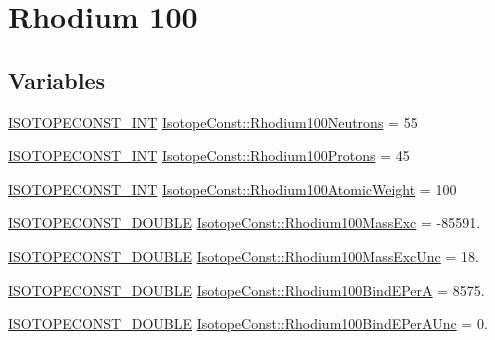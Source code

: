 \hypertarget{group___isotope_const-_rhodium-_rh100}{}\section{Rhodium 100}
\label{group___isotope_const-_rhodium-_rh100}
\subsection*{Variables}
\begin{DoxyCompactItemize}
\item 
\mbox{\hyperlink{group___isotope_const-_macros_ga5f18360b3e99483a35c32d789e62621c}{I\+S\+O\+T\+O\+P\+E\+C\+O\+N\+S\+T\+\_\+\+I\+NT}} \mbox{\hyperlink{group___isotope_const-_rhodium-_rh100_ga7943ad6589b4fe859db04a8a1a07a814}{Isotope\+Const\+::\+Rhodium100\+Neutrons}} = 55
\item 
\mbox{\hyperlink{group___isotope_const-_macros_ga5f18360b3e99483a35c32d789e62621c}{I\+S\+O\+T\+O\+P\+E\+C\+O\+N\+S\+T\+\_\+\+I\+NT}} \mbox{\hyperlink{group___isotope_const-_rhodium-_rh100_ga111dadcfed7ce05ee302af04a01bf5b7}{Isotope\+Const\+::\+Rhodium100\+Protons}} = 45
\item 
\mbox{\hyperlink{group___isotope_const-_macros_ga5f18360b3e99483a35c32d789e62621c}{I\+S\+O\+T\+O\+P\+E\+C\+O\+N\+S\+T\+\_\+\+I\+NT}} \mbox{\hyperlink{group___isotope_const-_rhodium-_rh100_ga36c97e33d57041eb40756de80b7f1cb8}{Isotope\+Const\+::\+Rhodium100\+Atomic\+Weight}} = 100
\item 
\mbox{\hyperlink{group___isotope_const-_macros_ga8f45a7272ce02c0b4c65c44636ed719a}{I\+S\+O\+T\+O\+P\+E\+C\+O\+N\+S\+T\+\_\+\+D\+O\+U\+B\+LE}} \mbox{\hyperlink{group___isotope_const-_rhodium-_rh100_ga8375b85370324d155621dcaed4cbadf2}{Isotope\+Const\+::\+Rhodium100\+Mass\+Exc}} = -\/85591.
\item 
\mbox{\hyperlink{group___isotope_const-_macros_ga8f45a7272ce02c0b4c65c44636ed719a}{I\+S\+O\+T\+O\+P\+E\+C\+O\+N\+S\+T\+\_\+\+D\+O\+U\+B\+LE}} \mbox{\hyperlink{group___isotope_const-_rhodium-_rh100_ga04c970123fe638c3a24f77a9545494cb}{Isotope\+Const\+::\+Rhodium100\+Mass\+Exc\+Unc}} = 18.
\item 
\mbox{\hyperlink{group___isotope_const-_macros_ga8f45a7272ce02c0b4c65c44636ed719a}{I\+S\+O\+T\+O\+P\+E\+C\+O\+N\+S\+T\+\_\+\+D\+O\+U\+B\+LE}} \mbox{\hyperlink{group___isotope_const-_rhodium-_rh100_ga89c6229d879f3738706ac1475521a93a}{Isotope\+Const\+::\+Rhodium100\+Bind\+E\+PerA}} = 8575.
\item 
\mbox{\hyperlink{group___isotope_const-_macros_ga8f45a7272ce02c0b4c65c44636ed719a}{I\+S\+O\+T\+O\+P\+E\+C\+O\+N\+S\+T\+\_\+\+D\+O\+U\+B\+LE}} \mbox{\hyperlink{group___isotope_const-_rhodium-_rh100_ga7c21b252943d0ef3365b4e4e6e6359fa}{Isotope\+Const\+::\+Rhodium100\+Bind\+E\+Per\+A\+Unc}} = 0.

\end{DoxyCompactItemize}
